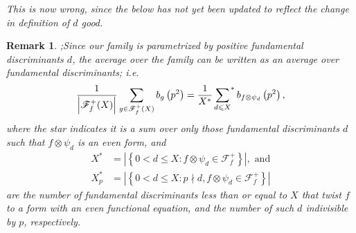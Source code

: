 \documentclass[11pt,reqno]{amsart} \usepackage{fullpage}
\newtheorem{remark}[lemma]{Remark}
\renewcommand{\leq}{\leqslant}
\newcommand{\F}{\ensuremath{\mathbf{F}}}
\newcommand\be{\begin{equation}}
\newcommand\ee{\end{equation}}
\renewcommand{\F}{\mathcal F_f}
\numberwithin{equation}{section}
\begin{document}
{\it\color{Plum}This is now wrong, since the below has not yet been updated to reflect the
  change in definition of $d$ good.}
\begin{remark};Since our family is parametrized by positive fundamental discriminants $d$,
  the average over the family can be written as an average over fundamental discriminants;
  i.e. \be\frac1{\left|\F^+(X)\right|}\sum_{g\in\F^+(X)}b_g\left(p^2\right)
  =\frac1{X^\ast}\left.\sum_{\mathclap{d\leq X}}\right.^\ast
  b_{f\otimes\psi_d}\left(p^2\right),\ee where the star indicates it is a sum over only
  those fundamental discriminants $d$ such that $f\otimes\psi_d$ is an even form, and
  \begin{align}
    X^\ast&=\left|\left\{0<d\leq X:f\otimes\psi_d\in\F^+\right\}\right|,\text{ and}\\
    X^\ast_p&=\left|\left\{0<d\leq X:p\nmid d,f\otimes\psi_d\in\F^+\right\}\right|
  \end{align}
  are the number of fundamental discriminants less than or equal to $X$ that twist $f$ to a
  form with an even functional equation, and the number of such $d$ indivisible by $p$,
  respectively.
\end{remark}
  
\end{document}
